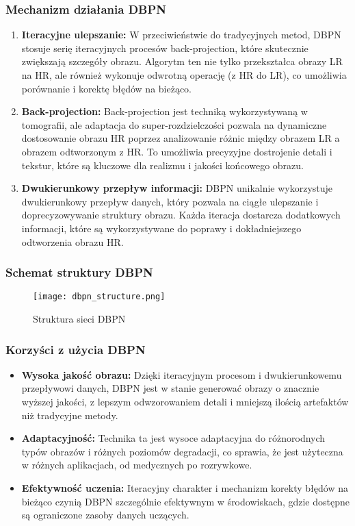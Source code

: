 \documentclass[10pt]{article}
\begin{document}
\subsubsection*{Mechanizm działania DBPN}

\begin{enumerate}
    \item \textbf{Iteracyjne ulepszanie:} W przeciwieństwie do tradycyjnych metod, DBPN stosuje serię iteracyjnych procesów back-projection, które skutecznie zwiększają szczegóły obrazu. Algorytm ten nie tylko przekształca obrazy LR na HR, ale również wykonuje odwrotną operację (z HR do LR), co umożliwia porównanie i korektę błędów na bieżąco.
    \item \textbf{Back-projection:} Back-projection jest techniką wykorzystywaną w tomografii, ale adaptacja do super-rozdzielczości pozwala na dynamiczne dostosowanie obrazu HR poprzez analizowanie różnic między obrazem LR a obrazem odtworzonym z HR. To umożliwia precyzyjne dostrojenie detali i tekstur, które są kluczowe dla realizmu i jakości końcowego obrazu.
    \item \textbf{Dwukierunkowy przepływ informacji:} DBPN unikalnie wykorzystuje dwukierunkowy przepływ danych, który pozwala na ciągłe ulepszanie i doprecyzowywanie struktury obrazu. Każda iteracja dostarcza dodatkowych informacji, które są wykorzystywane do poprawy i dokładniejszego odtworzenia obrazu HR.
\end{enumerate}

\subsubsection*{Schemat struktury DBPN}

\begin{figure}[h!]
    \centering
    \texttt{[image: dbpn\_structure.png]}
    \caption{Struktura sieci DBPN}
    \label{fig:dbpn_structure}
\end{figure}

\subsubsection*{Korzyści z użycia DBPN}

\begin{itemize}
    \item \textbf{Wysoka jakość obrazu:} Dzięki iteracyjnym procesom i dwukierunkowemu przepływowi danych, DBPN jest w stanie generować obrazy o znacznie wyższej jakości, z lepszym odwzorowaniem detali i mniejszą ilością artefaktów niż tradycyjne metody.
    \item \textbf{Adaptacyjność:} Technika ta jest wysoce adaptacyjna do różnorodnych typów obrazów i różnych poziomów degradacji, co sprawia, że jest użyteczna w różnych aplikacjach, od medycznych po rozrywkowe.
    \item \textbf{Efektywność uczenia:} Iteracyjny charakter i mechanizm korekty błędów na bieżąco czynią DBPN szczególnie efektywnym w środowiskach, gdzie dostępne są ograniczone zasoby danych uczących.
\end{itemize}
\end{document}
